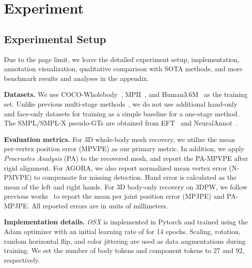 \documentclass[10pt,twocolumn,letterpaper]{article}
\newcommand{\modelname}{\emph{OSX}\xspace}
\begin{document}
 \vspace{0.1cm}
\section{Experiment}
\label{sec:exp}


\subsection{Experimental Setup}
Due to the page limit, we leave the detailed experiment setup, implementation, annotation visualization, qualitative comparison with SOTA methods, and more benchmark results and analyses in the appendix.

\noindent\textbf{Datasets.}
We use COCO-Wholebody~\cite{jin2020wholebody}, MPII~\cite{andriluka2014mpii}, and Human3.6M~\cite{Ionescu_2014_hm36} as the training set. Unlike previous multi-stage methods~\cite{PavlakosGeorgios2020expose, GyeongsikMoon2020hand4whole}, we do not use additional hand-only and face-only datasets for training as a simple baseline for a one-stage method. The SMPL/SMPL-X pseudo-GTs are obtained from EFT~\cite{joo2020exemplar} and NeuralAnnot~\cite{Moon_2022NeuralAnnot}. 

\noindent\textbf{Evaluation metrics.}
For 3D whole-body mesh recovery, we utilize the mean per-vertex position error (MPVPE) as our primary metric. In addition, we apply \emph{Procrustes Analysis} (PA) to the recovered mesh, and report the PA-MPVPE after rigid alignment. For AGORA, we also report normalized mean vertex error (N-PMVPE) to compensate for missing detection. Hand error is calculated as the mean of the left and right hands.
For 3D body-only recovery on 3DPW, we follow previous works~\cite{zeng2022deciwatch,Kolotouros_2019_spin} to report the mean per joint position error (MPJPE) and PA-MPJPE. 
All reported errors are in units of millimeters.

\noindent \textbf{Implementation details.}
\modelname is implemented in Pytorch and trained using the Adam optimizer with an initial learning rate of  for 14 epochs. Scaling, rotation, random horizontal flip, and color jittering are used as data augmentations during training. We set the number of body tokens  and component tokens  to 27 and 92, respectively. 
\end{document}
